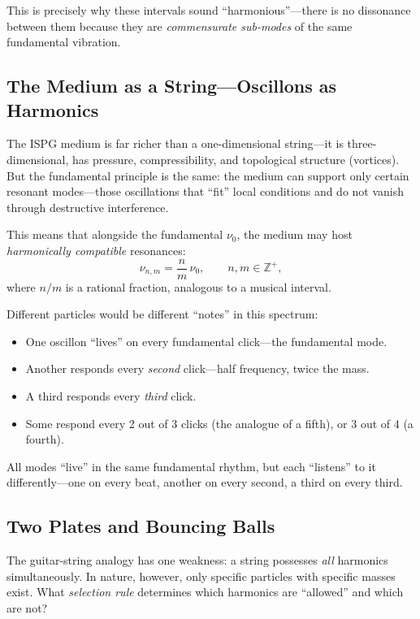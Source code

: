 \documentclass[11pt]{article}
\begin{document}
This is precisely why these intervals sound ``harmonious''---there
is no dissonance between them because they are \emph{commensurate
sub-modes} of the same fundamental vibration.

\subsection{The Medium as a String---Oscillons as Harmonics}

The ISPG medium is far richer than a one-dimensional string---it is
three-dimensional, has pressure, compressibility, and topological
structure (vortices). But the fundamental principle is the same: the
medium can support only certain resonant modes---those oscillations
that ``fit'' local conditions and do not vanish through destructive
interference.

This means that alongside the fundamental $\nu_0$, the medium may
host \emph{harmonically compatible} resonances:
\begin{equation}
  \nu_{n,m} = \frac{n}{m}\,\nu_0,
  \qquad n, m \in \mathbb{Z}^{+},
  \label{eq:rational_freq}
\end{equation}
where $n/m$ is a rational fraction, analogous to a musical
interval.

Different particles would be different ``notes'' in this spectrum:
\begin{itemize}
  \item One oscillon ``lives'' on every fundamental click---the
    fundamental mode.
  \item Another responds every \emph{second} click---half
    frequency, twice the mass.
  \item A third responds every \emph{third} click.
  \item Some respond every 2 out of 3 clicks (the analogue of a
    fifth), or 3 out of 4 (a fourth).
\end{itemize}

All modes ``live'' in the same fundamental rhythm, but each
``listens'' to it differently---one on every beat, another on every
second, a third on every third.

\subsection{Two Plates and Bouncing Balls}

The guitar-string analogy has one weakness: a string possesses
\emph{all} harmonics simultaneously. In nature, however, only
specific particles with specific masses exist. What \emph{selection
rule} determines which harmonics are ``allowed'' and which are not?
\end{document}
